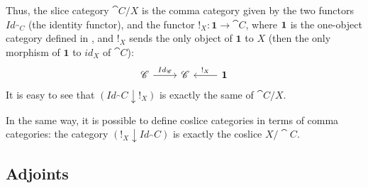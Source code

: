 Thus, the slice category $\cat C / X$ is the comma category given by the two functors $Id_{\cat C}$ (the identity functor), and the functor $!_X: \textbf{1} \rightarrow \cat C$, where $\textbf 1$ is the one-object category defined in , and $!_X$ sends the only object of $\textbf{1}$ to $X$ (then the only morphism of $\textbf{1}$ to $id_X$ of $\cat C$):
\[
    \begin{tikzcd}
        \cat C \arrow[r, "{Id_\cat C}"] & \cat C & \textbf{1} \arrow[l, "{!_X}"swap]
    \end{tikzcd}
\]
It is easy to see that $(Id_\cat C \downarrow !_X)$ is exactly the same of $\cat C / X$.

In the same way, it is possible to define coslice categories in terms of comma categories: the category $(!_X \downarrow Id_\cat C)$ is exactly the coslice $X / \cat C $.



\subsection{Adjoints}



